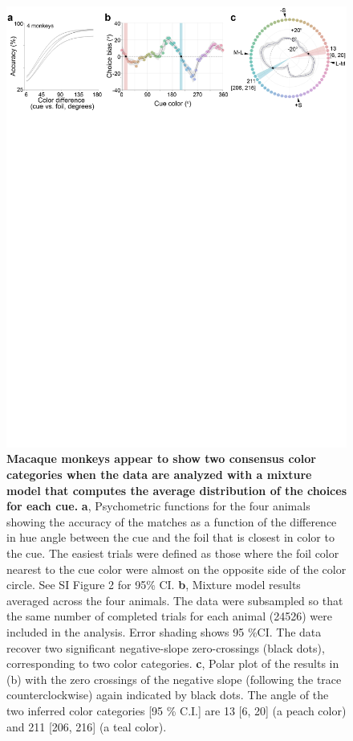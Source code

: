 \begin{figure}
    \begin{fullwidth}
    \centering
    \includegraphics[width=\textwidth+4cm,trim={0 20cm 0 0},clip]{../Figures/flat/F2_CombinedMMResults_5.jpg}
    \caption{\textbf{Macaque monkeys appear to show two consensus color categories when the data are analyzed with a mixture model that computes the average distribution of the choices for each cue.}
	\textbf{a}, Psychometric functions for the four animals showing the accuracy of the matches as a function of the difference in hue angle between the cue and the foil that is closest in color to the cue. 
	The easiest trials were defined as those where the foil color nearest to the cue color were almost on the opposite side of the color circle. See SI Figure 2 for 95\% CI. 
	\textbf{b}, Mixture model results averaged across the four animals. The data were subsampled so that the same number of completed trials for each animal (24526) were included in the analysis. Error shading shows 95 \%CI. 
	The data recover two significant negative-slope zero-crossings (black dots), corresponding to two color categories. 
	\textbf{c}, Polar plot of the results in (b) with the zero crossings of the negative slope (following the trace counterclockwise) again indicated by black dots. The angle of the two inferred color categories [95 \% C.I.] are 13 [6, 20] (a peach color) and 211 [206, 216] (a teal color). }
    \label{fig:AvResults}
    \end{fullwidth}
\end{figure}

